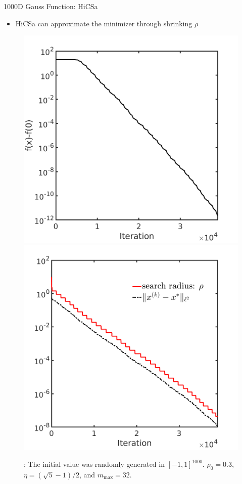 \documentclass{beamer}
\begin{document}
\begin{frame}{1000D Gauss Function: HiCSa}
\normalsize{
	\begin{itemize}
		\item HiCSa can approximate the minimizer through shrinking $\rho$ 
	\end{itemize}
	}
\begin{figure}[!htbp]
	\centering
	  \includegraphics[scale=0.2]{./figures/gauss1000D.png}
	  \includegraphics[scale=0.2]{./figures/gauss1000D_dist.png}
\footnotesize{
	\caption{: 
	The initial value was randomly generated in $[-1,1]^{1000}$.
	$\rho_0=0.3$, $\eta=(\sqrt{5}-1)/2$, and $m_{\max}=32$.}
	}
\end{figure}

\end{frame}
\end{document}
